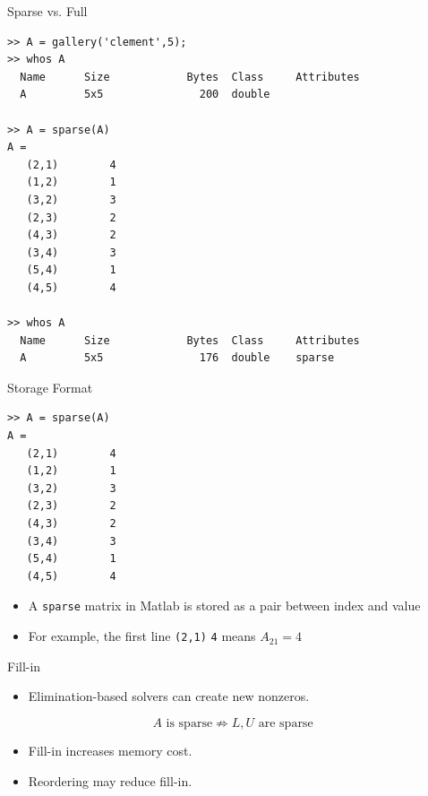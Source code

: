 \documentclass[10pt]{beamer}
\begin{document}
\begin{frame}[fragile]{Sparse vs. Full}
\begin{lstlisting}
>> A = gallery('clement',5);
>> whos A
  Name      Size            Bytes  Class     Attributes
  A         5x5               200  double     

>> A = sparse(A)
A =
   (2,1)        4
   (1,2)        1
   (3,2)        3
   (2,3)        2
   (4,3)        2
   (3,4)        3
   (5,4)        1
   (4,5)        4

>> whos A
  Name      Size            Bytes  Class     Attributes
  A         5x5               176  double    sparse    
\end{lstlisting}

\end{frame}
\begin{frame}[fragile]{Storage Format}
\begin{lstlisting}
>> A = sparse(A)
A =
   (2,1)        4
   (1,2)        1
   (3,2)        3
   (2,3)        2
   (4,3)        2
   (3,4)        3
   (5,4)        1
   (4,5)        4  
\end{lstlisting}
\begin{itemize}
    \item A \texttt{sparse} matrix in Matlab is stored as a pair between index and value
    \item For example, the first line \texttt{(2,1)}  \texttt{4} means $A_{21}=4$
\end{itemize}
\end{frame}



\begin{frame}{Fill-in}

\begin{itemize}

    \item Elimination-based solvers can create new nonzeros.
\end{itemize}

$$
A \text{ is sparse} \nRightarrow L,U \text{ are sparse}
$$



\begin{itemize}
    \item Fill-in increases memory cost. 
    \item Reordering may reduce fill-in.
\end{itemize}



\end{frame}
\end{document}
